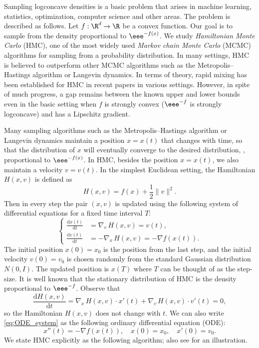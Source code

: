 \documentclass{toc}
\newcommand{\dif}{\mathrm{d}}
\newcommand{\grad}{\nabla}
\begin{document}
Sampling logconcave densities is a basic problem that arises in machine learning, statistics, optimization, computer science and other areas. The problem is described as follows. Let $f: \R^d \to \R$ be a convex function. Our goal is to sample from the density proportional to $\eee^{-f(x)}$. We study \textit{Hamiltonian Monte Carlo} (HMC), one of the most
%
widely used   %
\textit{Markov chain Monte Carlo} (MCMC) algorithms for sampling from a probability distribution. In many settings, HMC is believed to outperform other MCMC algorithms such as the Metropolis--Hastings algorithm or Langevin dynamics. 
In terms of theory, rapid mixing has been established for HMC in recent papers \cite{LSV18,LV18,MS17,MS19,MV18}
%
in  %
various settings. However, in spite of much progress,
%
a gap remains %
between
the  %
known upper and lower bounds even in the basic setting when $f$ is strongly convex ($\eee^{-f}$ is strongly logconcave) and has a Lipschitz gradient.  

%

Many sampling algorithms such as the Metropolis--Hastings algorithm or Langevin dynamics maintain a position $x=x(t)$ that changes with time, so that the distribution of $x$ will eventually converge to the desired distribution, \ie, proportional to $\eee^{-f(x)}$.  
In HMC, besides the position $x=x(t)$, we also maintain a velocity $v=v(t)$. In the simplest Euclidean setting, the Hamiltonian $H(x,v)$ is defined as
\begin{equation}
%
H(x,v) = f(x) + \frac{1}{2} \|v\|^2.
\end{equation}
Then in every step the pair $(x,v)$ is updated using the following system of differential equations for a fixed time interval $T$:
\begin{equation}\label{eq:ODE_system}
\left\{
\begin{aligned}
\frac{\dif x(t)}{\dif t} &= \grad_v\, H(x,v)
%
= v(t),\\
\frac{\dif v(t)}{\dif t} &= -\grad_x\, H(x,v)
%
= -\grad f(x(t)).
\end{aligned}
\right.
\end{equation}
The initial position $x(0) = x_0$ is the position from the last step, and the initial velocity $v(0) = v_0$ is chosen randomly from the standard Gaussian distribution $N(0,I)$. The updated position is $x(T)$ where $T$ can be thought of as the step-size. 
It is %
well known  %
that the stationary distribution of HMC is the density proportional
to $\eee^{-f}$. 
Observe that 
\[
\frac{\dif H(x,v)}{\dif t} = 
%
\grad_x\, H(x,v) \cdot x'(t) + 
%
\grad_v\, H(x,v) \cdot v'(t) = 0, 
\] 
so the Hamiltonian $H(x,v)$ does not change with $t$. 
We can also write \eqref{eq:ODE_system} as the following ordinary differential equation (ODE):
\begin{equation}\label{eq:ODE_Ham}
x''(t) = -\grad f(x(t)), \quad x(0) = x_0, \quad x'(0) = v_0.
\end{equation}
We state HMC explicitly as the following algorithm; also see 
 for an illustration.
\end{document}
